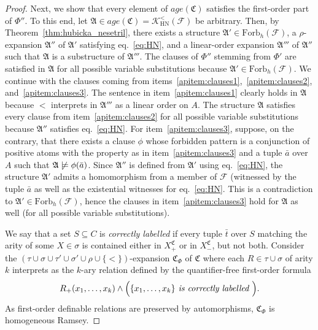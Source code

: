 \documentclass[oneside,reqno,12pt]{amsart}
\theoremstyle{plain}
\theoremstyle{remark}
\newenvironment{claimproof}[1][\proofname]
{\renewcommand\qedsymbol{$\diamond$}\proof[#1]}
{\endproof}
\newcommand{\struct}[1]{\mathfrak{#1}}
\newcommand{\age}{\ensuremath{\mathit{age}}\xspace}
\newcommand{\Forb}{\ensuremath{\mathrm{Forb}}\xspace}
\begin{document}
{\begin{proof}
\begin{claimproof}
Next, we show that every element of $\age(\struct{C})$ satisfies the first-order part of $\Phi''$.
To this end, let $\struct{A}\in \age(\struct{C})=\mathcal{K}^{<}_{\mathrm{HN}}(\mathcal{F})$ be arbitrary.
Then, by Theorem~\ref{thm:hubicka_nesetril}, there exists a structure $\struct{A}'\in \Forb_h(\mathcal{F})$, a $\rho$-expansion $\struct{A}''$ of $\struct{A}'$ satisfying eq.~\eqref{eq:HN}, and a linear-order expansion $\struct{A}'''$ of $\struct{A}''$ such that $\struct{A}$ is a substructure of $\struct{A}'''$.
The clauses of $\Phi''$ stemming from $\Phi'$ are satisfied in $\struct{A}$ for all possible variable substitutions because $\struct{A}'\in \Forb_h(\mathcal{F})$.
We continue with the clauses coming from items~\eqref{apitem:clauses1},~\eqref{apitem:clauses2}, and~\eqref{apitem:clauses3}.
The sentence in item~\eqref{apitem:clauses1} clearly holds in $\struct{A}$ because $<$ interprets in $\struct{A}'''$ as a linear order on $A$. 
The structure $\struct{A}$ satisfies every clause from item~\eqref{apitem:clauses2} for all possible variable substitutions because $\struct{A}''$ satisfies eq.~\eqref{eq:HN}.
For item~\eqref{apitem:clauses3}, suppose, on the contrary, that there exists a clause $\phi$ whose forbidden pattern is a conjunction of positive atoms with the property as in item~\eqref{apitem:clauses3} and a tuple $\bar{a}$ over $A$ such that $\struct{A}\centernot{\models} \phi(\bar{a})$.
Since $\struct{A}''$ is defined from $\struct{A}'$ using eq.~\eqref{eq:HN}, the structure $\struct{A}'$ admits a homomorphism from a member of $\mathcal{F}$ (witnessed by the tuple $\bar{a}$ as well as the existential witnesses for eq.~\eqref{eq:HN}. 
This is a contradiction to $\struct{A}'\in \Forb_h(\mathcal{F})$, hence the clauses in item~\eqref{apitem:clauses3} hold for $\struct{A}$ as well (for all possible variable substitutions). 
\end{claimproof}




We say that a set $S\subseteq C$ is \emph{correctly labelled} if every tuple $\bar{t}$ over $S$ matching the arity of some $X\in \sigma$ is contained either in $X_+^{\struct{C}}$ or in $X_-^{\struct{C}}$, but not both.
Consider the $(\tau\cup\sigma\cup \tau'\cup \sigma' \cup \rho \cup \{<\})$-expansion $\struct{C}_{\Phi}$ of $\struct{C}$ where each $R\in \tau\cup \sigma$ of arity $k$ interprets as the $k$-ary relation defined by the quantifier-free first-order formula
\begin{align*}
R_+(x_1,\dots,x_k) \wedge \Bigl(\{x_1,\dots, x_k\} \textit{ is correctly labelled }\Bigr).  
\end{align*} 
As first-order definable relations are preserved by automorphisms, $\struct{C}_{\Phi}$ is homogeneous Ramsey.



\end{proof}}
\end{document}
